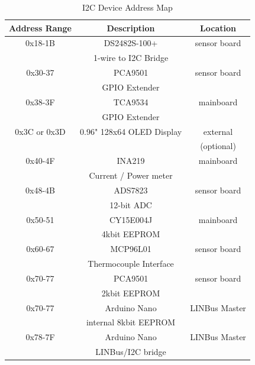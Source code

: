 \documentclass[lettersize,journal]{IEEEtran}
\begin{document}
\begin{table}
\begin{center}
\caption{I2C Device Address Map}
\label{i2c-addresses}
\begin{tabular}{| c | c | c |}
\hline
Address Range & Description & Location \\
\hline
0x18-1B & DS2482S-100+ & sensor board \\
& 1-wire to I2C Bridge & \\
\hline
0x30-37 & PCA9501 & sensor board \\
& GPIO Extender & \\
\hline
0x38-3F & TCA9534 & mainboard \\
& GPIO Extender & \\
\hline
0x3C or 0x3D & 0.96" 128x64 OLED Display & external \\
& & (optional) \\
\hline
0x40-4F & INA219 & mainboard \\
& Current / Power meter & \\
\hline
0x48-4B & ADS7823 & sensor board \\
& 12-bit ADC & \\
\hline
0x50-51 & CY15E004J & mainboard \\
& 4kbit EEPROM & \\
\hline
0x60-67 & MCP96L01 & sensor board \\
& Thermocouple Interface & \\
\hline
0x70-77 & PCA9501 & sensor board \\
& 2kbit EEPROM & \\
\hline
0x70-77 & Arduino Nano & LINBus Master \\
& internal 8kbit EEPROM & \\
\hline
0x78-7F & Arduino Nano & LINBus Master \\
& LINBus/I2C bridge & \\
\hline
\end{tabular}
\end{center}
\end{table}
\end{document}

